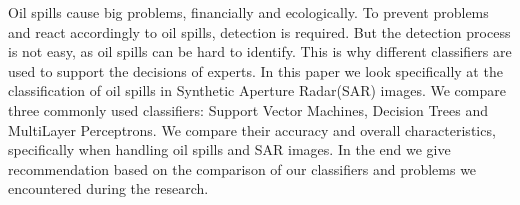 Oil spills cause big problems, financially and ecologically. To prevent problems and react accordingly to oil spills, detection is required. But the detection process is not easy, as oil spills can be hard to identify. This is why different classifiers are used to support the decisions of experts. In this paper we look specifically at the classification of oil spills in Synthetic Aperture Radar(SAR) images. We compare three commonly used classifiers: Support Vector Machines, Decision Trees and MultiLayer Perceptrons. We compare their accuracy and overall characteristics, specifically when handling oil spills and SAR images. In the end we give recommendation based on the comparison of our classifiers and problems we encountered during the research.